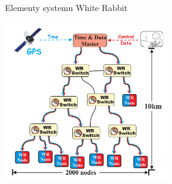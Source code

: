 \documentclass[compress,red]{beamer}
\begin{document}
\subsection{}
\begin{frame}{Elementy systemu White Rabbit}

      \begin{center}
      \includegraphics[width=7cm]{network/wr_network-new.pdf}
      \end{center}

\end{frame}
\end{document}
